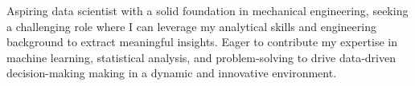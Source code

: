 




Aspiring data scientist with a solid foundation in mechanical engineering, seeking a challenging role where I can leverage my analytical skills and engineering background to extract meaningful insights.
Eager to contribute my expertise in machine learning, statistical analysis, and problem-solving to drive data-driven decision-making making in a dynamic and innovative environment.

